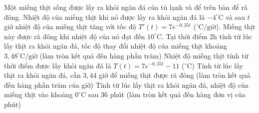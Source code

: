 \begin{ex}%
 Một miếng thịt sống được lấy ra khỏi ngăn đá của tủ lạnh và để trên bàn để rã đông. Nhiệt độ của miếng thịt khi nó được lấy ra khỏi ngăn đá là $-4^\circ\text{C}$ và sau $t$ giờ nhiệt độ của miếng thịt tăng với tốc độ $T'(t) = 7e^{-0,35t}$ ($^\circ\text{C}/\text{giờ}$). Miếng thịt này được rã đông khi nhiệt độ của nó đạt đến $10^\circ\text{C}$.
 \choiceTF
 {Tại thời điểm $2$h tính từ lúc lấy thịt ra khỏi ngăn đá, tốc độ thay đổi nhiệt độ của miếng thịt khoảng $3,48^\circ\text{C}/\text{giờ}$ (làm tròn kết quả đến hàng phần trăm)}
 {\True Nhiệt độ miếng thịt tính từ thời điểm được lấy khỏi ngăn đá là $T(t) = 7e^{-0,35t} - 11$ ($^\circ\text{C}$)}
 {Tính từ lúc lấy thịt ra khỏi ngăn đá, cần $3,44$ giờ để miếng thịt được rã đông (làm tròn kết quả đến hàng phần trăm của giờ)}
 {Tính từ lúc lấy thịt ra khỏi ngăn đá, nhiệt độ của miếng thịt vào khoảng $0^\circ\text{C}$ sau $36$ phút (làm tròn kết quả đến hàng đơn vị của phút)}
\end{ex}
